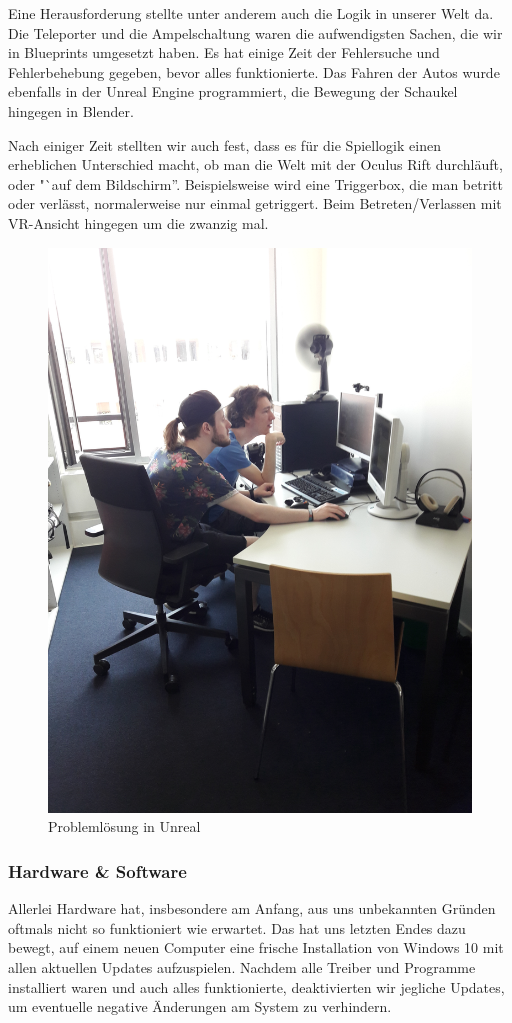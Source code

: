\documentclass{Bericht}
\begin{document}
			Eine Herausforderung stellte unter anderem auch die Logik in unserer Welt da. Die Teleporter und die Ampelschaltung waren die aufwendigsten Sachen, die wir in Blueprints umgesetzt haben. Es hat einige Zeit der Fehlersuche und Fehlerbehebung gegeben, bevor alles funktionierte. Das Fahren der Autos wurde ebenfalls in der Unreal Engine programmiert, die Bewegung der Schaukel hingegen in Blender.
			
			Nach einiger Zeit stellten wir auch fest, dass es für die Spiellogik einen erheblichen Unterschied macht, ob man die Welt mit der Oculus Rift durchläuft, oder "`auf dem Bildschirm''. Beispielsweise wird eine Triggerbox, die man betritt oder verlässt, normalerweise nur einmal getriggert. Beim Betreten/Verlassen mit VR-Ansicht hingegen um die zwanzig mal.
			
		\begin{figure}[!htbp] %
			\centering
			\includegraphics[trim = 200mm 0mm 600mm 0mm, clip, height=\linewidth, width=\textheight, keepaspectratio, angle=270]{../Bilder/20170619_102101.jpg} %
			\caption{Problemlösung in Unreal}
			\label{img:porblemloesung}
		\end{figure}
		
		\subsubsection{Hardware \& Software}
			Allerlei Hardware hat, insbesondere am Anfang, aus uns unbekannten Gründen oftmals nicht so funktioniert wie erwartet. Das hat uns letzten Endes dazu bewegt, auf einem neuen Computer eine frische Installation von Windows 10 mit allen aktuellen Updates aufzuspielen. Nachdem alle Treiber und Programme installiert waren und auch alles funktionierte, deaktivierten wir jegliche Updates, um eventuelle negative Änderungen am System zu verhindern. 
			
\end{document}
